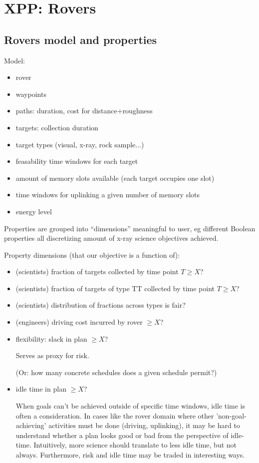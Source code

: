 \section{XPP: Rovers}
\label{xpp-rovers}



\subsection{Rovers model and properties}
\label{xpp-rovers:model}

Model: 
\begin{itemize}
\item rover
\item waypoints
\item paths: duration, cost for distance+roughness
\item targets: collection duration
\item target types (visual, x-ray, rock sample...)
\item feasability time windows for each target
\item amount of memory slots available (each target occupies one slot)
\item time windows for uplinking a given number of memory slots
\item energy level
\end{itemize}

Properties are grouped into ``dimensions'' meaningful to user, eg
different Boolean properties all discretizing amount of x-ray science
objectives achieved.


Property dimensions (that our objective is a function of):
\begin{itemize}
\item (scientists) fraction of targets collected by time point $T \geq
  X$?
\item (scientists) fraction of targets of type TT collected by time
  point $T \geq X$?
\item (scientists) distribution of fractions across types is fair?
\item (engineers) driving cost incurred by rover $\geq X$?
\item flexibility: slack in plan $\geq X$? 

  Serves as proxy for risk.

  (Or: how many concrete schedules does a given schedule permit?)
\item idle time in plan $\geq X$?

  When goals can't be achieved outside of specific time windows, idle
  time is often a consideration.  In cases like the rover domain where
  other 'non-goal-achieving' activities must be done (driving,
  uplinking), it may be hard to understand whether a plan looks good
  or bad from the perspective of idle-time. Intuitively, more science
  should translate to less idle time, but not always.  Furthermore,
  risk and idle time may be traded in interesting ways.

\end{itemize}


